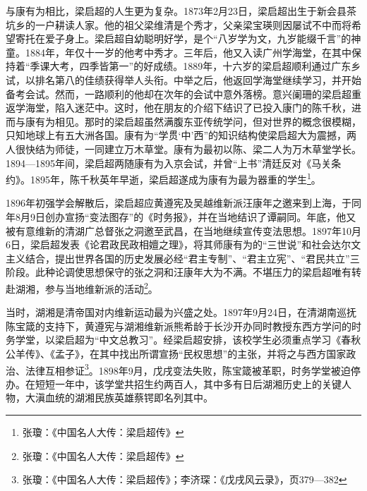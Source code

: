 与康有为相比，梁启超的人生更为复杂。1873年2月23日，梁启超出生于新会县茶坑乡的一户耕读人家。他的祖父梁维清是个秀才，父亲梁宝瑛则因屡试不中而将希望寄托在爱子身上。梁启超自幼聪明好学，是个“八岁学为文，九岁能缀千言”的神童。1884年，年仅十一岁的他考中秀才。三年后，他又入读广州学海堂，在其中保持着“季课大考，四季皆第一”的好成绩。1889年，十六岁的梁启超顺利通过广东乡试，以排名第八的佳绩获得举人头衔。中举之后，他返回学海堂继续学习，并开始备考会试。然而，一路顺利的他却在次年的会试中意外落榜。意兴阑珊的梁启超重返学海堂，陷入迷茫中。这时，他在朋友的介绍下结识了已投入康门的陈千秋，进而与康有为相见。那时的梁启超虽然满腹东亚传统学问，但对世界的概念很模糊，只知地球上有五大洲各国。康有为“学贯‘中’西”的知识结构使梁启超大为震撼，两人很快结为师徒，一同建立万木草堂。康有为最初以陈、梁二人为万木草堂学长。1894—1895年间，梁启超两随康有为入京会试，并曾“上书”清廷反对《马关条约》。1895年，陈千秋英年早逝，梁启超遂成为康有为最为器重的学生\footnote{张瓊：《中国名人大传：梁启超传》}。

1896年初强学会解散后，梁启超应黄遵宪及吴越维新派汪康年之邀来到上海，于同年8月9日创办宣扬“变法图存”的《时务报》，并在当地结识了谭嗣同。年底，他又被有意维新的清湖广总督张之洞邀至武昌，在当地继续宣传变法思想。1897年10月6日，梁启超发表《论君政民政相嬗之理》，将其师康有为的“三世说”和社会达尔文主义结合，提出世界各国的历史发展必经“君主专制”、“君主立宪”、“君民共立”三阶段。此种论调使思想保守的张之洞和汪康年大为不满。不堪压力的梁启超唯有转赴湖湘，参与当地维新派的活动\footnote{张瓊：《中国名人大传：梁启超传》}。

当时，湖湘是清帝国对内维新运动最为兴盛之处。1897年9月24日，在清湖南巡抚陈宝箴的支持下，黄遵宪与湖湘维新派熊希龄于长沙开办同时教授东西方学问的时务学堂，以梁启超为“中文总教习”。经梁启超安排，该校学生必须重点学习《春秋公羊传》、《孟子》，在其中找出所谓宣扬“民权思想”的主张，并将之与西方国家政治、法律互相参证\footnote{张瓊：《中国名人大传：梁启超传》；李济琛：《戊戌风云录》，页379—382}。1898年9月，戊戌变法失败，陈宝箴被革职，时务学堂被迫停办。在短短一年中，该学堂共招生约两百人，其中多有日后湖湘历史上的关键人物，大滇血统的湖湘民族英雄蔡锷即名列其中。

